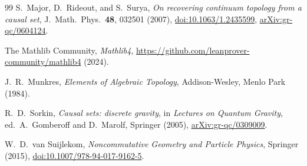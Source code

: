 \documentclass[11pt,a4paper]{article}
\theoremstyle{plain}
\theoremstyle{definition}
\theoremstyle{remark}
\begin{document}
\begin{thebibliography}{99}
S.~Major, D.~Rideout, and S.~Surya,
\emph{On recovering continuum topology from a causal set},
J.\ Math.\ Phys.\ \textbf{48}, 032501 (2007),
\href{https://doi.org/10.1063/1.2435599}{doi:10.1063/1.2435599},
\href{https://arxiv.org/abs/gr-qc/0604124}{arXiv:gr-qc/0604124}.

The Mathlib Community,
\emph{Mathlib4},
\url{https://github.com/leanprover-community/mathlib4} (2024).

J.~R.~Munkres,
\emph{Elements of Algebraic Topology},
Addison-Wesley, Menlo Park (1984).

R.~D.~Sorkin,
\emph{Causal sets: discrete gravity},
in \emph{Lectures on Quantum Gravity}, ed.\ A.~Gomberoff and
D.~Marolf, Springer (2005),
\href{https://arxiv.org/abs/gr-qc/0309009}{arXiv:gr-qc/0309009}.

W.~D.~van Suijlekom,
\emph{Noncommutative Geometry and Particle Physics},
Springer (2015),
\href{https://doi.org/10.1007/978-94-017-9162-5}{doi:10.1007/978-94-017-9162-5}.

\end{thebibliography}
\end{document}
